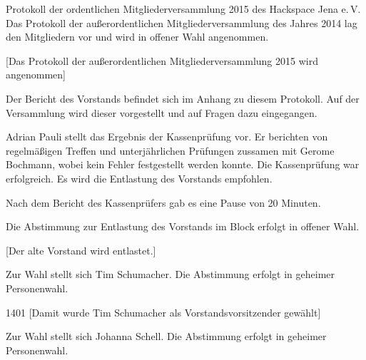 \documentclass[ngerman]{scrartcl}
\begin{document}
\begin{Protokoll}{Protokoll der ordentlichen Mitgliederversammlung 2015 des Hackspace Jena e.\,V.}
Das Protokoll der außerordentlichen Mitgliederversammlung des Jahres
2014 lag den Mitgliedern vor und wird in offener Wahl angenommen.

\begin{Abstimmung}
  [Das Protokoll der außerordentlichen Mitgliederversammlung 2015 wird angenommen]
\end{Abstimmung}


Der Bericht des Vorstands befindet sich im Anhang zu diesem
Protokoll. Auf der Versammlung wird dieser vorgestellt und auf Fragen
dazu eingegangen.



Adrian Pauli stellt das Ergebnis der Kassenprüfung vor. Er berichten
von regelmäßigen Treffen und unterjährlichen Prüfungen zussamen mit
Gerome Bochmann, wobei kein Fehler festgestellt werden konnte. Die
Kassenprüfung war erfolgreich. Es wird die Entlastung des Vorstands
empfohlen.

Nach dem Bericht des Kassenprüfers gab es eine Pause von 20 Minuten.


Die Abstimmung zur Entlastung des Vorstands im Block erfolgt in offener Wahl.
\begin{Abstimmung}
  [Der alte Vorstand wird entlastet.]
\end{Abstimmung}




Zur Wahl stellt sich Tim Schumacher. Die Abstimmung erfolgt in geheimer
Personenwahl.

\begin{Abstimmung}
  {14}{0}{1}
  [Damit wurde Tim Schumacher als Vorstandsvorsitzender gewählt]
\end{Abstimmung}



Zur Wahl stellt sich Johanna Schell. Die Abstimmung erfolgt in geheimer Personenwahl.


\end{Protokoll}
\end{document}
